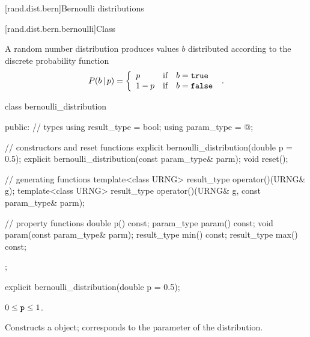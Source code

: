 
[rand.dist.bern]{Bernoulli distributions}%
%


[rand.dist.bern.bernoulli]{Class }%
%

\pnum
A  random number distribution
produces  values $b$
distributed according to
the discrete probability function
%
\[%
 P(b\,|\,p)
      = \left\{ \begin{array}{lcl}
          p    &  \mbox{if} & b = \tcode{true} \\
          1-p  &  \mbox{if} & b = \tcode{false}
        \end{array}\right.
\; \mbox{.}
\]

\begin{codeblock}
class bernoulli_distribution
{
public:
 // types
 using result_type = bool;
 using param_type  = @\unspec@;

 // constructors and reset functions
 explicit bernoulli_distribution(double p = 0.5);
 explicit bernoulli_distribution(const param_type& parm);
 void reset();

 // generating functions
 template<class URNG>
   result_type operator()(URNG& g);
 template<class URNG>
   result_type operator()(URNG& g, const param_type& parm);

 // property functions
 double p() const;
 param_type param() const;
 void param(const param_type& parm);
 result_type min() const;
 result_type max() const;
};
\end{codeblock}


%
\begin{itemdecl}
explicit bernoulli_distribution(double p = 0.5);
\end{itemdecl}

\begin{itemdescr}
\pnum\requires
 $0 \leq \texttt{p} \leq 1$.

\pnum\effects Constructs a  object;
 corresponds to the parameter of the distribution.
\end{itemdescr}


